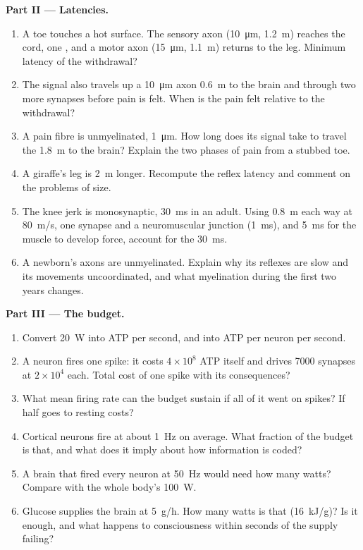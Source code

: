 \begin{problem}
\medskip
\noindent\textbf{Part II --- Latencies.}
\begin{enumerate}[resume]
  \item A toe touches a hot surface. The sensory axon (\qty{10}{\micro m},
        \qty{1.2}{m}) reaches the cord, one , and a motor axon
        (\qty{15}{\micro m}, \qty{1.1}{m}) returns to the leg. Minimum
        latency of the withdrawal?
  \item The signal also travels up a \qty{10}{\micro m} axon
        \qty{0.6}{m} to the brain and through two more synapses before
        pain is felt. When is the pain felt relative to the withdrawal?
  \item A pain fibre is unmyelinated, \qty{1}{\micro m}. How long does
        its signal take to travel the \qty{1.8}{m} to the brain? Explain
        the two phases of pain from a stubbed toe.
  \item A giraffe's leg is \qty{2}{m} longer. Recompute the reflex
        latency and comment on the problems of size.
  \item The knee jerk is monosynaptic, \qty{30}{ms} in an adult. Using
        \qty{0.8}{m} each way at \qty{80}{m/s}, one synapse and a
        neuromuscular junction (\qty{1}{ms}), and \qty{5}{ms} for the
        muscle to develop force, account for the \qty{30}{ms}.
  \item A newborn's axons are unmyelinated. Explain why its reflexes are
        slow and its movements uncoordinated, and what myelination
        during the first two years changes.
\end{enumerate}

\medskip
\noindent\textbf{Part III --- The budget.}
\begin{enumerate}[resume]
  \item Convert \qty{20}{W} into ATP per second, and into ATP per neuron
        per second.
  \item A neuron fires one spike: it costs $4\times 10^{8}$ ATP itself
        and drives \num{7000} synapses at $2\times 10^{4}$ each. Total
        cost of one spike with its consequences?
  \item What mean firing rate can the budget sustain if all of it went
        on spikes? If half goes to resting costs?
  \item Cortical neurons fire at about \qty{1}{Hz} on average. What
        fraction of the budget is that, and what does it imply about
        how information is coded?
  \item A brain that fired every neuron at \qty{50}{Hz} would need how
        many watts? Compare with the whole body's \qty{100}{W}.
  \item Glucose supplies the brain at \qty{5}{g/h}. How many watts is
        that (\qty{16}{kJ/g})? Is it enough, and what happens to
        consciousness within seconds of the supply failing?
\end{enumerate}


\end{problem}
